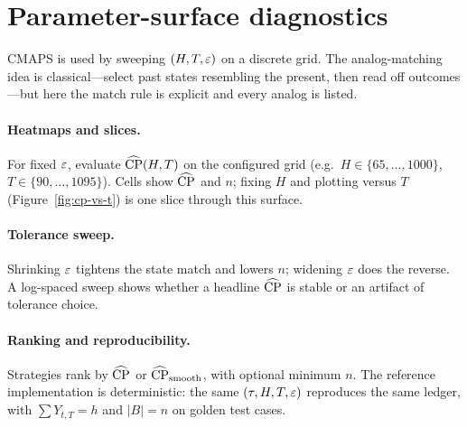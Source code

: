 \section{Parameter-surface diagnostics}
\label{sec:diagnostics}

CMAPS is used by sweeping $(H,T,\varepsilon)$ on a discrete grid.
The analog-matching idea is classical---select past states resembling the present, then read off outcomes \cite{lorenz1969empirical}---but here the match rule is explicit and every analog is listed.

\paragraph{Heatmaps and slices.}
For fixed $\varepsilon$, evaluate $\widehat{\mathrm{CP}}(H,T)$ on the configured grid (e.g.\ $H \in \{65,\ldots,1000\}$, $T \in \{90,\ldots,1095\}$).
Cells show $\widehat{\mathrm{CP}}$ and $n$; fixing $H$ and plotting versus $T$ (Figure~\ref{fig:cp-vs-t}) is one slice through this surface.

\paragraph{Tolerance sweep.}
Shrinking $\varepsilon$ tightens the state match and lowers $n$; widening $\varepsilon$ does the reverse.
A log-spaced sweep shows whether a headline $\widehat{\mathrm{CP}}$ is stable or an artifact of tolerance choice.

\paragraph{Ranking and reproducibility.}
Strategies rank by $\widehat{\mathrm{CP}}$ or $\widehat{\mathrm{CP}}_{\mathrm{smooth}}$, with optional minimum $n$.
The reference implementation is deterministic: the same $(\tau,H,T,\varepsilon)$ reproduces the same ledger, with $\sum Y_{t,T} = h$ and $|B|=n$ on golden test cases.
